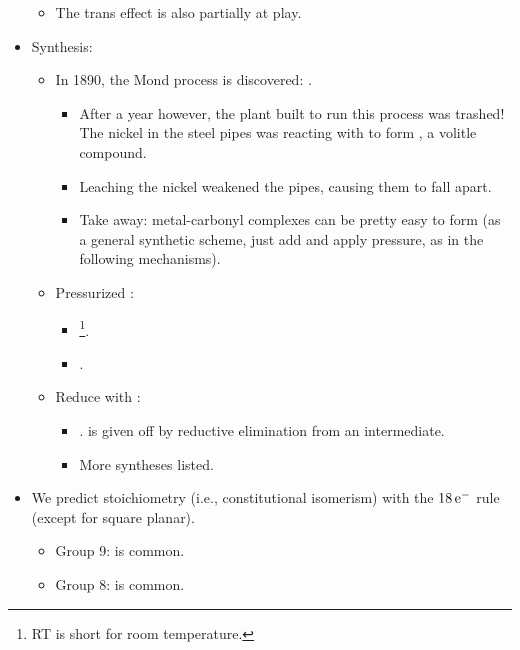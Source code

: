\documentclass[../notes.tex]{subfiles}
\begin{document}
\begin{itemize}
    \begin{itemize}
        \item The trans effect is also partially at play.
    \end{itemize}
    \item Synthesis:
    \begin{itemize}
        \item In 1890, the Mond process is discovered: .
        \begin{itemize}
            \item After a year however, the plant built to run this process was trashed! The nickel in the steel pipes was reacting with  to form , a volitle compound.
            \item Leaching the nickel weakened the pipes, causing them to fall apart.
            \item Take away: metal-carbonyl complexes can be pretty easy to form (as a general synthetic scheme, just add  and apply pressure, as in the following mechanisms).
        \end{itemize}
        \item Pressurized :
        \begin{itemize}
            \item {}\footnote{RT is short for room temperature.}.
            \item {}.
        \end{itemize}
        \item Reduce with :
        \begin{itemize}
            \item {}.  is given off by reductive elimination from an intermediate.
            \item More syntheses listed.
        \end{itemize}
    \end{itemize}
    \item We predict stoichiometry (i.e., constitutional isomerism) with the $18\,\e[-]$ rule (except for square planar).
    \begin{itemize}
        \item Group 9:  is common.
        \item Group 8:  is common.
    \end{itemize}

\end{itemize}
\end{document}
